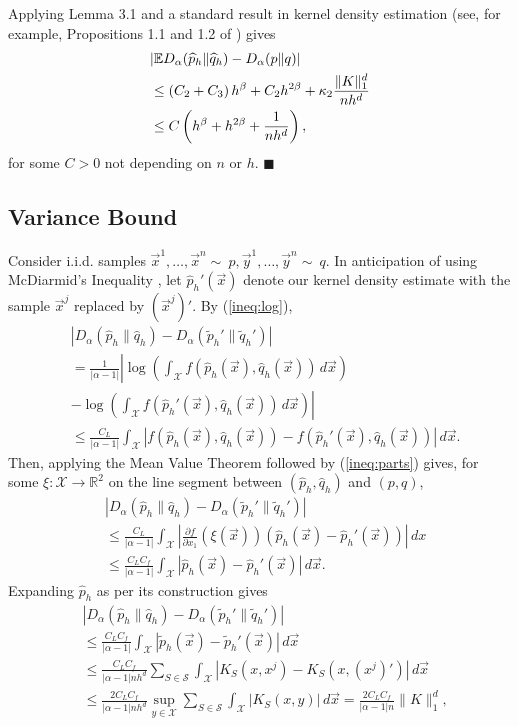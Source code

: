 \documentclass{article}
\renewcommand{\qed}{\quad \ensuremath{\blacksquare}}    %
\newcommand{\R}{\mathbb{R}}                         %
\newcommand{\Se}{\mathcal{S}}                       %
\newcommand{\X}{\mathcal{X}}                        %
\newcommand{\E}{\mathbb{E}}                         %
\newcommand{\cpest}{\widehat{p}_h}                  %
\newcommand{\cqest}{\widehat{q}_h}                  %
\newcommand{\pest}{\widetilde{p}_h}                 %
\newcommand{\qest}{\widetilde{q}_h}                 %
\newcommand{\vx}{\vec{x}}                           %
\newcommand{\vy}{\vec{y}}                           %
\begin{document}
Applying Lemma 3.1 and a standard result in kernel density estimation (see, for
example, Propositions 1.1 and 1.2 of \citet{Tsybakov:2008:INE:1522486}) gives
\begin{align}
\notag
 & |\E D_\alpha(\cpest \| \cqest) - D_\alpha(p \| q)|   \\
\label{ineq:bias_consts}
 &  \leq \left( C_2 + C_3 \right)h^\beta
    + C_2 h^{2\beta}
    + \kappa_2 \frac{\|K\|_1^d}{nh^d} \\
\notag
 & \leq C\left(h^\beta + h^{2\beta} + \frac{1}{nh^d}\right),
\end{align}
for some $C > 0$ not depending on $n$ or $h$. \qed
\subsection{Variance Bound}
Consider i.i.d. samples $\vx^1,\dots,\vx^n\sim~p, \vy^1,\dots,\vy^n\sim~q$. In
anticipation of using McDiarmid's Inequality \citep{McDiarmid1989}, let
$\cpest'(\vx)$ denote our kernel density estimate with the sample $\vx^j$
replaced by $(\vx^j)'$. By (\ref{ineq:log}),
\begin{align*}
 & |D_\alpha(\cpest\|\cqest) - D_\alpha(\pest'\|\qest')|    \\
 &  = \frac{1}{|\alpha - 1|}
        \left| \log\left(\int_\X f(\cpest(\vx), \cqest(\vx)) \, d\vx\right)
                \right. \\
 &  - \left. \log\left(\int_\X f(\cpest'(\vx),\cqest(\vx)) \, d\vx\right)
                \right| \\
 &  \leq \frac{C_L}{|\alpha - 1|} \int_\X
        \left| f(\cpest(\vx),\cqest(\vx)) - f(\cpest'(\vx),\cqest(\vx))
                \right| \, d\vx.
\end{align*}
Then, applying the Mean Value Theorem followed by (\ref{ineq:parts}) gives, for
some  $\xi : \X \to \R^2$ on the line segment between $(\cpest,\cqest)$
and $(p,q)$,
\begin{align*}
 & |D_\alpha(\cpest\|\cqest) - D_\alpha(\pest'\|\qest')|    \\
 &  \leq \frac{C_L}{|\alpha - 1|}
    \int_\X \left| \frac{\partial f}{\partial x_1} (\xi(\vx))
            (\cpest(\vx) - \cpest'(\vx)) \right| \, dx  \\
 &  \leq \frac{C_LC_f}{|\alpha - 1|}
    \int_\X \left| \cpest(\vx) - \cpest'(\vx) \right| \, d\vx.
\end{align*}
Expanding $\cpest$ as per its construction gives
\begin{align*}
 & |D_\alpha(\cpest\|\cqest) - D_\alpha(\pest'\|\qest')|        \\
 &  \leq \frac{C_LC_f}{|\alpha - 1|}
    \int_\X \left| \pest(\vx) - \pest'(\vx) \right| \, d\vx     \\
 &  \leq \frac{C_LC_f}{|\alpha - 1|nh^d} \sum_{S \in \Se}
    \int_\X \left|K_S(x,x^j) - K_S(x,(x^j)') \right| \, d\vx    \\
 &  \leq \frac{2C_LC_f}{|\alpha - 1|nh^d} \sup_{y \in \X} \sum_{S \in \Se}
    \int_\X \left|K_S(x,y) \right| \, d\vx
    = \frac{2C_LC_f}{|\alpha - 1|n} \|K\|_1^d,
\end{align*}
\end{document}
